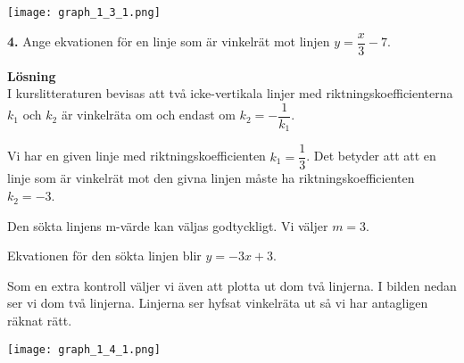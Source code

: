 \documentclass{article}
\begin{document}
\texttt{[image: graph\_1\_3\_1.png]} 

\textbf{4.} Ange ekvationen för en linje som är vinkelrät mot linjen $y=\dfrac{x}{3}-7$.

\textbf{Lösning}\\
I kurslitteraturen bevisas att två icke-vertikala linjer med riktningskoefficienterna $k_{1}$ och $k_{2}$ är vinkelräta om och endast om $k_{2} = -\dfrac{1}{k_{1}}$.

Vi har en given linje med riktningskoefficienten $k_{1} = \dfrac{1}{3}$. Det betyder att att en linje som är vinkelrät mot den givna linjen måste ha  riktningskoefficienten $k_{2}=-3$.

Den sökta linjens m-värde kan väljas godtyckligt. Vi väljer $m = 3$.

Ekvationen för den sökta linjen blir $y = -3x + 3$.

Som en extra kontroll väljer vi även att plotta ut dom två linjerna. I bilden nedan ser vi dom två linjerna. Linjerna ser hyfsat vinkelräta ut så vi har antagligen räknat rätt.

\texttt{[image: graph\_1\_4\_1.png]}
\end{document}
